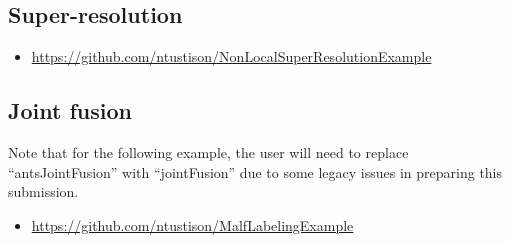 \documentclass{InsightArticle}
\begin{document}
\subsection{Super-resolution}

\begin{itemize}
  \item \url{https://github.com/ntustison/NonLocalSuperResolutionExample}
\end{itemize}

\subsection{Joint fusion}

Note that for the following example, the user will need to replace ``antsJointFusion''
with ``jointFusion'' due to some legacy issues in preparing this submission.

\begin{itemize}
  \item \url{https://github.com/ntustison/MalfLabelingExample}
\end{itemize}

%
%



\end{document}
